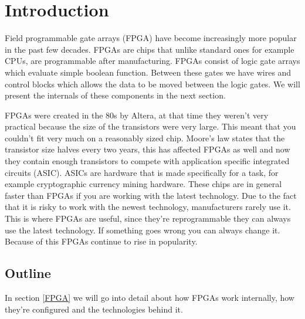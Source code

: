 \chapter{Introduction\label{intro}}

Field programmable gate arrays (FPGA) have become increasingly more popular in
the past few decades. FPGAs are chips that unlike standard ones for example
CPUs, are programmable after manufacturing. FPGAs consist of logic gate arrays
which evaluate simple boolean function. Between these gates we have wires and
control blocks which allows the data to be moved between the logic gates. We
will present the internals of these components in the next section.

FPGAs were created in the 80s by Altera, at that time they weren't very
practical because the size of the transistors were very large. This meant that
you couldn't fit very much on a reasonably sized chip. Moore's law states that
the transistor size halves every two years, this has affected FPGAs as well and
now they contain enough transistors to compete with application specific
integrated circuits (ASIC). ASICs are hardware that is made specifically for a
task, for example cryptographic currency mining hardware. These chips are in
general faster than FPGAs if you are working with the latest technology. Due to
the fact that it is risky to work with the newest technology, manufacturers
rarely use it. This is where FPGAs are useful, since they're reprogrammable
they can always use the latest technology. If something goes wrong you can
always change it. Because of this FPGAs continue to rise in popularity. %

\section{Outline\label{outline}}
In section \ref{FPGA} we will go into detail about how FPGAs work
internally, how they're configured and the technologies behind it.
